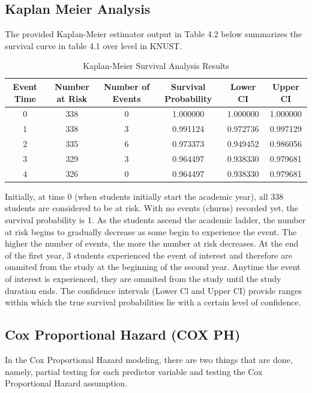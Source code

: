 \documentclass[doublespacing]{report} %
\begin{document}
\subsection{Kaplan Meier Analysis}

The provided Kaplan-Meier estimator output in Table 4.2 below summarizes the survival curve in table 4.1 over level in KNUST.

\begin{table}[ht]
    \centering
    \begin{tabular}{cccccc}
        \toprule
        Event Time & Number at Risk& Number of Events & Survival Probability & Lower CI & Upper CI \\
        \midrule
        0 & 338 & 0 & 1.000000 & 1.000000 & 1.000000 \\
        1 & 338 & 3 & 0.991124 & 0.972736 & 0.997129 \\
        2 & 335 & 6 & 0.973373 & 0.949452 & 0.986056 \\
        3 & 329 & 3 & 0.964497 & 0.938330 & 0.979681 \\
        4 & 326 & 0 & 0.964497 & 0.938330 & 0.979681 \\
        \bottomrule
    \end{tabular}
    \caption{Kaplan-Meier Survival Analysis Results}
    \label{tab:km_results}
\end{table}


Initially, at time 0 (when students initially start the academic year), all 338 students are considered to be at risk. With no events (churns) recorded yet, the survival probability is 1.
As the students ascend the academic ladder, the number at risk begins to gradually decrease as some begin to experience the event. The higher the number of events, the more the number at risk decreases. 
At the end of the first year, 3 students experienced the event of interest and therefore are ommited from the study at the beginning of the second year.  Anytime the event of interest is experienced, they are ommited from the study until the study duration ends.   
The confidence intervals (Lower Cl and Upper CI) provide ranges within which the true survival probabilities lie with a certain level of confidence.


\subsection{Cox Proportional Hazard (COX PH)}

In the Cox Proportional Hazard modeling, there are two things that are done, namely, partial testing for each predictor variable and testing the Cox Proportional Hazard assumption. 
\end{document}
